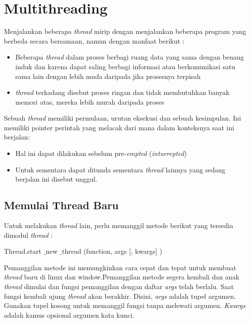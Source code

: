 \section{Multithreading}
\hspace*{0.5in} Menjalankan beberapa\textit{ thread} mirip dengan menjalankan beberapa program yang berbeda secara bersamaan, namun dengan manfaat berikut : 

\begin{itemize}
\item Beberapa \textit{thread} dalam proses berbagi ruang data yang sama dengan benang induk dan karena dapat saling berbagi informasi atau berkomunikasi satu sama lain dengan lebih muda daripada jika prosesnya terpisah 

\item \textit{thread} terkadang disebut proses ringan dan tidak membutuhkan banyak memori atas, mereka lebih murah daripada proses
\end{itemize}

\hspace*{0.5in} Sebuah \textit{thread} memiliki permulaan, urutan eksekusi dan sebuah kesimpulan. Ini memiliki pointer perintah yang melacak dari mana dalam konteksnya saat ini berjalan:

\begin{itemize}
\item Hal ini dapat dilakukan sebelum pre-\textit{empted} (\textit{inturrepted})

\item Untuk sementara dapat ditunda sementara \textit{thread} lainnya yang sedang berjalan ini disebut unggul.
\end{itemize}
 
\subsection {Memulai Thread Baru} 
\hspace*{0.5in} Untuk melakukan \textit{thread} lain, perlu memanggil metode berikut yang tersedia dimodul \textit{thread} : 
\begin{center}{\fontsize{9pt}{9pt}\selectfont Thread.start $  \_  $new $  \_  $thread (function, args [, kwargs] )}
\end{center} 
\hspace*{0.5in} Pemanggilan metode ini memungkinkan cara cepat dan tepat untuk membuat \textit{thread} baru di linux dan window.Pemanggilan metode segera kembali dan anak  \textit{thread} dimulai dan fungsi pemanggilan dengan daftar \textit{args} telah berlalu. Saat fungsi kembali ujung \textit{thread} akan berakhir. Disini, \textit{args }adalah tupel argumen. Gunakan tupel kosong untuk memanggil fungsi tanpa melewati argumen. \textit{Kwargs} adalah kamus opsional argumen kata kunci.  
 
